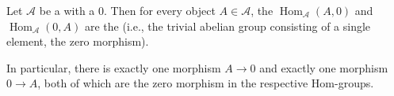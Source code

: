 \begin{lemma} \label{lemma:hom_to_from_zero_object_in_preadditive_category_is_zero_group}
Let $\mathcal{A}$ be a  with a  $0$. Then for every object $A \in \mathcal{A}$, the  $\operatorname{Hom}_{\mathcal{A}}(A, 0)$ and $\operatorname{Hom}_{\mathcal{A}}(0, A)$ are the  (i.e., the trivial abelian group consisting of a single element, the zero morphism).

In particular, there is exactly one morphism $A \to 0$ and exactly one morphism $0 \to A$, both of which are the zero morphism in the respective Hom-groups.
\end{lemma}